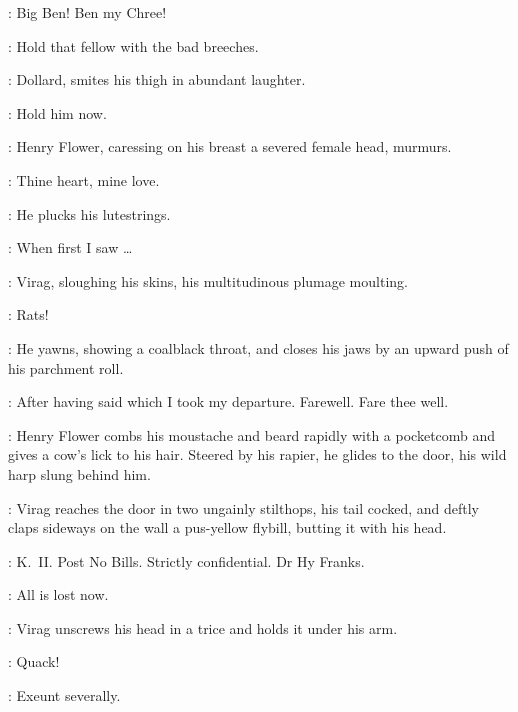 \Virgins:
Big Ben!
Ben my Chree!

\Voice:
Hold that fellow with the bad breeches.

:
Dollard,
smites his thigh in abundant laughter.

\BenDollard:
Hold him now.

:
Henry Flower,
caressing on his breast a severed female head,
murmurs.

\Henry:
Thine heart,
mine love.

:
He plucks his lutestrings.

\Henry:
When first I saw \ldots

:
Virag,
sloughing his skins,
his multitudinous plumage moulting.

\Virag:
Rats!

:
He yawns,
showing a coalblack throat,
and closes his jaws by an upward push of his parchment roll.

\Virag:
After having said which I took my departure.
Farewell.
Fare thee well.

:
Henry Flower combs his moustache and beard rapidly with a pocketcomb
and gives a cow's lick to his hair.
Steered by his rapier,
he glides to the door,
his wild harp slung behind him.

:
Virag reaches the door in two ungainly stilthops,
his tail cocked,
and deftly claps sideways on the wall
a pus-yellow flybill,
butting it with his head.

\Flybill[2]:
K.~II.
Post No Bills.
Strictly confidential.
Dr Hy Franks.

\Henry:
All is lost now.

:
Virag unscrews his head in a trice and holds it under his arm.

\ViragsHead:
Quack!

\All:
Exeunt severally.


